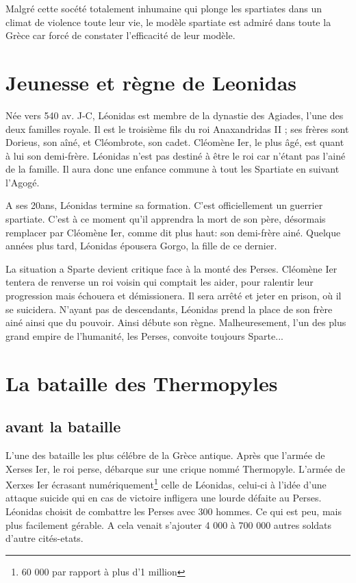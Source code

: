 \documentclass[10pt,a4paper]{article}
\begin{document}
Malgré cette socété totalement inhumaine qui plonge les spartiates dans un climat de violence toute leur vie, le modèle spartiate est admiré dans toute la Grèce car forcé de constater l'efficacité de leur modèle.



\section{Jeunesse et règne de Leonidas}
    Née vers 540 av. J-C, Léonidas est membre de la dynastie des Agiades, l'une des deux familles royale. Il est le troisième fils du roi Anaxandridas II ; ses frères sont Dorieus, son aîné, et Cléombrote, son cadet. Cléomène Ier, le plus âgé, est quant à lui son demi-frère. Léonidas n'est pas destiné à être le roi car n'étant pas l'ainé de la famille. Il aura donc une enfance commune à tout les Spartiate en suivant l'Agogé.
    
    A ses 20ans, Léonidas termine sa formation. C'est officiellement un guerrier spartiate. C'est à ce moment qu'il apprendra la mort de son père, désormais remplacer par Cléomène Ier, comme dit plus haut: son demi-frère ainé. Quelque années plus tard, Léonidas épousera Gorgo, la fille de ce dernier.
    
    La situation a Sparte devient critique face à la monté des Perses. Cléomène Ier tentera de renverse un roi voisin qui comptait les aider, pour ralentir leur progression mais échouera et démissionera. Il sera arrêté et jeter en prison, où il se suicidera. N'ayant pas de descendants, Léonidas prend la place de son frère ainé ainsi que du pouvoir. Ainsi débute son règne. Malheuresement, l'un des plus grand empire de l'humanité, les Perses, convoite toujours Sparte...
    
\section{La bataille des Thermopyles}
\subsection{avant la bataille}
  L'une des bataille les plus célébre de la Grèce antique. Après que l'armée de Xerses Ier, le roi perse, débarque sur une crique nommé Thermopyle. L'armée de Xerxes Ier écrasant numériquement\footnote{60 000 par rapport à plus d'1 million} celle de Léonidas, celui-ci à l'idée d'une attaque suicide qui en cas de victoire infligera une lourde défaite au Perses. Léonidas choisit de combattre les Perses avec 300 hommes. Ce qui est peu, mais plus facilement gérable. A cela venait s'ajouter 4 000 à 700 000 autres soldats d'autre cités-etats.
  
\end{document}

